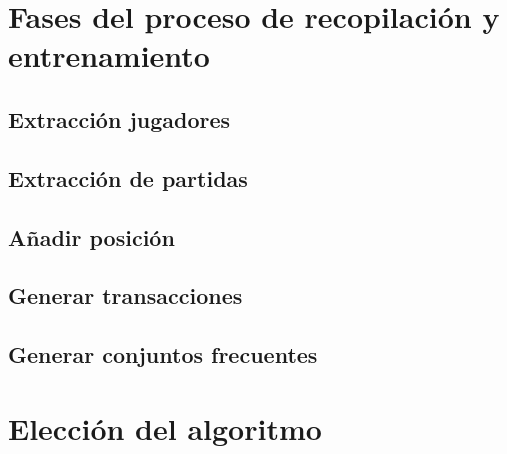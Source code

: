 \section{Fases del proceso de recopilación y entrenamiento}

\subsection{Extracción jugadores}
\subsection{Extracción de partidas}
\subsection{Añadir posición}
\subsection{Generar transacciones}
\subsection{Generar conjuntos frecuentes}


\section{Elección del algoritmo}

